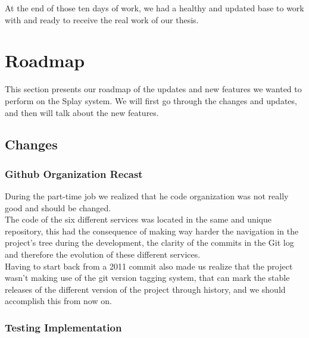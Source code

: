 \documentclass{eplmastersthesis}
\begin{document}
      At the end of those ten days of work, we had a healthy and updated
      base to work with and ready to receive the real work of our thesis.\\

    \section{Roadmap}

      This section presents our roadmap of the updates and new features
      we wanted to perform on the Splay system. We will first go through
      the changes and updates, and then will talk about the new features.

      \subsection{Changes}

        \subsubsection{Github Organization Recast}

          During the part-time job we realized that he code organization
          was not really good and should be changed.\\
          The code of the six different services was located in the same and
          unique repository, this had the consequence of making way harder
          the navigation in the project's tree during the development, the
          clarity of the commits in the Git log and therefore the evolution
          of these different services.\\

          Having to start back from a 2011 commit also made us realize that the
          project wasn't making use of the git version tagging system, that
          can mark the stable releases of the different version of the project
          through history, and we should accomplish this from now on.

        \subsubsection{Testing Implementation}
\end{document}
